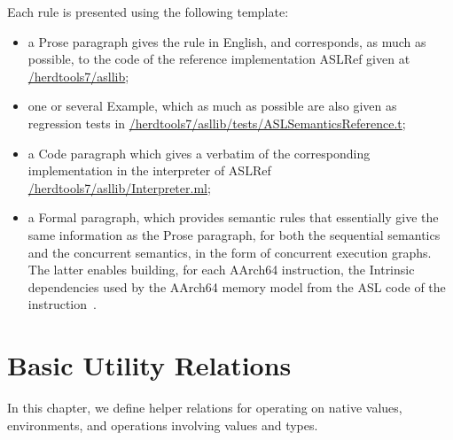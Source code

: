\documentclass{book}
\begin{document}
Each rule is presented using the following template:
\begin{itemize}
\item a Prose paragraph gives the rule in English, and corresponds, as much as possible, to the code of the reference implementation ASLRef given at
 \href{https://github.com/herd/herdtools7//tree/master/asllib}{/herdtools7/asllib};
\item one or several Example, which as much as possible are also given as regression tests in
\href{https://github.com/herd/herdtools7//tree/master/asllib/tests/ASLSemanticsReference.t}{/herdtools7/asllib/tests/ASLSemanticsReference.t};
\item a Code paragraph which gives a verbatim of the corresponding implementation in the interpreter of ASLRef
\href{https://github.com/herd/herdtools7//tree/master/asllib/Interpreter.ml}{/herdtools7/asllib/Interpreter.ml};
\item a Formal paragraph, which provides semantic rules that essentially give the same information as the Prose paragraph, for both
the sequential semantics and the concurrent semantics, in the form of concurrent execution graphs.
The latter enables building, for each AArch64 instruction,
the Intrinsic dependencies used by the AArch64 memory model from the ASL code of the instruction~\cite[B2.3.2]{ArmARM}.
\end{itemize}

\chapter{Basic Utility Relations \label{chap:utility}}

In this chapter, we define helper relations for operating on native values,
environments, and operations involving values and types.

\newcommand\declarelocalidentifier[0]{\texttt{declare\_local\_identifier}}
\newcommand\declarelocalidentifierm[0]{\texttt{declare\_local\_identifier\_m}}
\newcommand\declarelocalidentifiermm[0]{\texttt{declare\_local\_identifier\_mm}}
\newcommand\removelocal[0]{\texttt{remove\_local}}
\newcommand\readidentifier[0]{\texttt{read\_identifier}}
\newcommand\writeidentifier[0]{\texttt{write\_identifier}}
\newcommand\createbitvector[0]{\texttt{create\_bitvector}}
\newcommand\concatbitvectors[0]{\texttt{concat\_bitvectors}}
\newcommand\readfrombitvector[0]{\texttt{read\_from\_bitvector}}
\newcommand\writetobitvector[0]{\texttt{write\_to\_bitvector}}
\newcommand\asbitvector[0]{\texttt{as\_bitvector}}
\newcommand\slicestopositions[0]{\texttt{slices\_to\_positions}}
\newcommand\getindex[0]{\texttt{get\_index}}
\newcommand\setindex[0]{\texttt{set\_index}}
\newcommand\getfield[0]{\texttt{get\_field}}
\newcommand\setfield[0]{\texttt{set\_field}}
\newcommand\declareglobal[0]{\texttt{declare\_global}}
\newcommand\basevalue[0]{\texttt{base\_value}}
\newcommand\isvaloftype[0]{\texttt{is\_val\_of\_type}}
\end{document}
